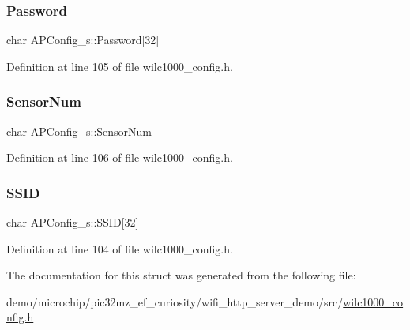 \mbox{\label{structAPConfig__s_a747595d1ce094cbbe7ca0bc0c060d906}} 
\subsubsection{\texorpdfstring{Password}{Password}}
{\footnotesize\ttfamily char A\+P\+Config\+\_\+s\+::\+Password\mbox{[}32\mbox{]}}



Definition at line 105 of file wilc1000\+\_\+config.\+h.

\mbox{\label{structAPConfig__s_ae720f9e917e48652652e2ee31881c1ea}} 
\subsubsection{\texorpdfstring{Sensor\+Num}{SensorNum}}
{\footnotesize\ttfamily char A\+P\+Config\+\_\+s\+::\+Sensor\+Num}



Definition at line 106 of file wilc1000\+\_\+config.\+h.

\mbox{\label{structAPConfig__s_adade6d799e6a8e55802da0cfb29e0c81}} 
\subsubsection{\texorpdfstring{S\+S\+ID}{SSID}}
{\footnotesize\ttfamily char A\+P\+Config\+\_\+s\+::\+S\+S\+ID\mbox{[}32\mbox{]}}



Definition at line 104 of file wilc1000\+\_\+config.\+h.



The documentation for this struct was generated from the following file\+:\begin{DoxyCompactItemize}
\item 
demo/microchip/pic32mz\+\_\+ef\+\_\+curiosity/wifi\+\_\+http\+\_\+server\+\_\+demo/src/\hyperlink{wilc1000__config_8h}{wilc1000\+\_\+config.\+h}\end{DoxyCompactItemize}
